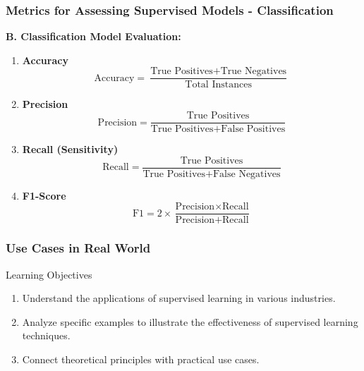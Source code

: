\documentclass[aspectratio=169]{beamer}
\begin{document}
\begin{frame}[fragile]
    \frametitle{Metrics for Assessing Supervised Models - Classification}

    \textbf{B. Classification Model Evaluation:}
    
    \begin{enumerate}
        \item \textbf{Accuracy}
        \begin{equation}
            \text{Accuracy} = \frac{\text{True Positives} + \text{True Negatives}}{\text{Total Instances}}
        \end{equation}
        
        \item \textbf{Precision}
        \begin{equation}
            \text{Precision} = \frac{\text{True Positives}}{\text{True Positives} + \text{False Positives}}
        \end{equation}

        \item \textbf{Recall (Sensitivity)}
        \begin{equation}
            \text{Recall} = \frac{\text{True Positives}}{\text{True Positives} + \text{False Negatives}}
        \end{equation}
        
        \item \textbf{F1-Score}
        \begin{equation}
            \text{F1} = 2 \times \frac{\text{Precision} \times \text{Recall}}{\text{Precision} + \text{Recall}}
        \end{equation}
    \end{enumerate}
\end{frame}

\begin{frame}[fragile]
    \frametitle{Use Cases in Real World}
    \begin{block}{Learning Objectives}
        \begin{enumerate}
            \item Understand the applications of supervised learning in various industries.
            \item Analyze specific examples to illustrate the effectiveness of supervised learning techniques.
            \item Connect theoretical principles with practical use cases.
        \end{enumerate}
    \end{block}
\end{frame}
\end{document}
